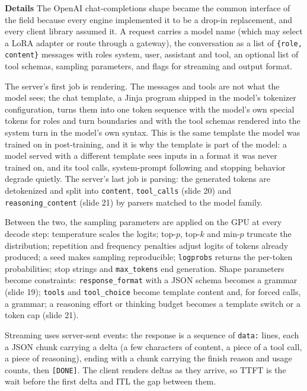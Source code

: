 \documentclass[11pt,letterpaper]{article}
\newcommand{\para}[1]{\medskip\noindent\textbf{#1}\quad}
\begin{document}
\para{Details} The OpenAI chat-completions shape became the common interface of the field because every engine implemented it to be a drop-in replacement, and every client library assumed it. A request carries a model name (which may select a LoRA adapter or route through a gateway), the conversation as a list of \texttt{\{role, content\}} messages with roles system, user, assistant and tool, an optional list of tool schemas, sampling parameters, and flags for streaming and output format.

The server's first job is rendering. The messages and tools are not what the model sees; the chat template, a Jinja program shipped in the model's tokenizer configuration, turns them into one token sequence with the model's own special tokens for roles and turn boundaries and with the tool schemas rendered into the system turn in the model's own syntax. This is the same template the model was trained on in post-training, and it is why the template is part of the model: a model served with a different template sees inputs in a format it was never trained on, and its tool calls, system-prompt following and stopping behavior degrade quietly. The server's last job is parsing: the generated tokens are detokenized and split into \texttt{content}, \texttt{tool\_calls} (slide 20) and \texttt{reasoning\_content} (slide 21) by parsers matched to the model family.

Between the two, the sampling parameters are applied on the GPU at every decode step: temperature scales the logits; top-$p$, top-$k$ and min-$p$ truncate the distribution; repetition and frequency penalties adjust logits of tokens already produced; a seed makes sampling reproducible; \texttt{logprobs} returns the per-token probabilities; stop strings and \texttt{max\_tokens} end generation. Shape parameters become constraints: \texttt{response\_format} with a JSON schema becomes a grammar (slide 19); \texttt{tools} and \texttt{tool\_choice} become template content and, for forced calls, a grammar; a reasoning effort or thinking budget becomes a template switch or a token cap (slide 21).

Streaming uses server-sent events: the response is a sequence of \texttt{data:} lines, each a JSON chunk carrying a delta (a few characters of content, a piece of a tool call, a piece of reasoning), ending with a chunk carrying the finish reason and usage counts, then \texttt{[DONE]}. The client renders deltas as they arrive, so TTFT is the wait before the first delta and ITL the gap between them.
\end{document}
